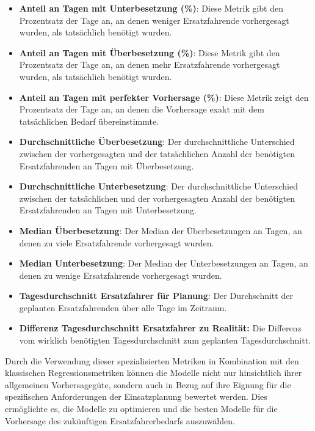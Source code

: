 \documentclass[%
pdftex,
oneside,			%
11pt,				%
parskip=half,		%
headheight = 12pt,	%
headsepline,		%
footsepline,		%
footheight = 16pt,	%
abstracton,		%
DIV=calc,		%
BCOR=8mm,		%
headinclude=false,	%
footinclude=false,	%
listof=totoc,		%
toc=bibliography,	%
]{scrreprt}	%
\begin{document}
        \begin{itemize}
            \item \textbf{Anteil an Tagen mit Unterbesetzung (\%)}: Diese Metrik gibt den Prozentsatz der Tage an, an denen weniger Ersatzfahrende vorhergesagt wurden, als tatsächlich benötigt wurden.
            \item \textbf{Anteil an Tagen mit Überbesetzung (\%)}: Diese Metrik gibt den Prozentsatz der Tage an, an denen mehr Ersatzfahrende vorhergesagt wurden, als tatsächlich benötigt wurden.
            \item \textbf{Anteil an Tagen mit perfekter Vorhersage (\%)}: Diese Metrik zeigt den Prozentsatz der Tage an, an denen die Vorhersage exakt mit dem tatsächlichen Bedarf übereinstimmte.
            \item \textbf{Durchschnittliche Überbesetzung}: Der durchschnittliche Unterschied zwischen der vorhergesagten und der tatsächlichen Anzahl der benötigten Ersatzfahrenden an Tagen mit Überbesetzung.
            \item \textbf{Durchschnittliche Unterbesetzung}: Der durchschnittliche Unterschied zwischen der tatsächlichen und der vorhergesagten Anzahl der benötigten Ersatzfahrenden an Tagen mit Unterbesetzung.
            \item \textbf{Median Überbesetzung}: Der Median der Überbesetzungen an Tagen, an denen zu viele Ersatzfahrende vorhergesagt wurden.
            \item \textbf{Median Unterbesetzung}: Der Median der Unterbesetzungen an Tagen, an denen zu wenige Ersatzfahrende vorhergesagt wurden.
            \item \textbf{Tagesdurchschnitt Ersatzfahrer für Planung}: Der Durchschnitt der geplanten Ersatzfahrenden über alle Tage im Zeitraum.
            \item \textbf{Differenz Tagesdurchschnitt Ersatzfahrer zu Realität:} Die Differenz vom wirklich benötigten Tagesdurchschnitt zum geplanten Tagesdurchschnitt.
        \end{itemize}

        Durch die Verwendung dieser spezialisierten Metriken in Kombination mit den klassischen Regressionsmetriken können die Modelle nicht nur hinsichtlich ihrer allgemeinen Vorhersagegüte, sondern auch in Bezug auf ihre Eignung für die spezifischen Anforderungen der Einsatzplanung bewertet werden. 
        Dies ermöglichte es, die Modelle zu optimieren und die besten Modelle für die Vorhersage des zukünftigen Ersatzfahrerbedarfs auszuwählen.
\end{document}

